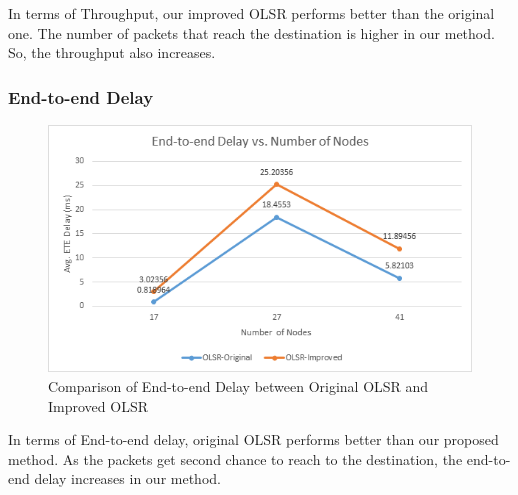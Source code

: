 \documentclass[12pt,a4paper]{report}
\begin{document}
In terms of Throughput, our improved OLSR performs better than the original one. The number of packets that reach the destination is higher in our method. So, the throughput also increases.



\subsubsection{End-to-end Delay}

\begin{figure}[hbtp]
\centering
\includegraphics[scale=.7]{Graphs/OLSR-ete-vs-nodes.png}
\caption{Comparison of End-to-end Delay between Original OLSR and Improved OLSR}
\end{figure}

In terms of End-to-end delay, original OLSR performs better than our proposed method. As the packets get second chance to reach to the destination, the end-to-end delay increases in our method. 


\newpage
\end{document}
